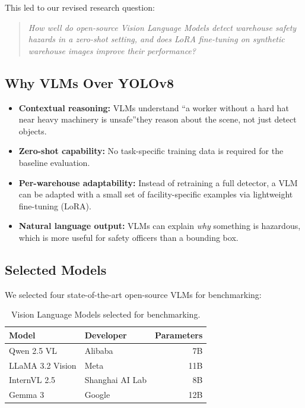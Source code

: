 \documentclass[12pt, a4paper]{article}
\begin{document}
This led to our revised research question:

\begin{quote}
    \textit{How well do open-source Vision Language Models detect warehouse safety hazards in a zero-shot setting, and does LoRA fine-tuning on synthetic warehouse images improve their performance?}
\end{quote}

\subsection{Why VLMs Over YOLOv8}

\begin{itemize}
    \item \textbf{Contextual reasoning:} VLMs understand ``a worker without a hard hat near heavy machinery is unsafe''they reason about the scene, not just detect objects.
    \item \textbf{Zero-shot capability:} No task-specific training data is required for the baseline evaluation.
    \item \textbf{Per-warehouse adaptability:} Instead of retraining a full detector, a VLM can be adapted with a small set of facility-specific examples via lightweight fine-tuning (LoRA).
    \item \textbf{Natural language output:} VLMs can explain \textit{why} something is hazardous, which is more useful for safety officers than a bounding box.
\end{itemize}

\subsection{Selected Models}

We selected four state-of-the-art open-source VLMs for benchmarking:

\begin{table}[h]
\centering
\begin{tabular}{llr}
\toprule
\textbf{Model} & \textbf{Developer} & \textbf{Parameters} \\
\midrule
Qwen 2.5 VL & Alibaba & 7B \\
LLaMA 3.2 Vision & Meta & 11B \\
InternVL 2.5 & Shanghai AI Lab & 8B \\
Gemma 3 & Google & 12B \\
\bottomrule
\end{tabular}
\caption{Vision Language Models selected for benchmarking.}
\end{table}
\end{document}
